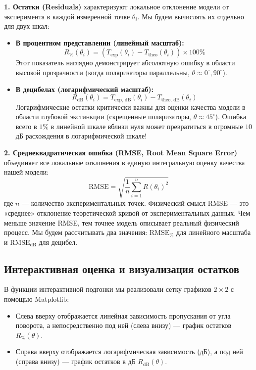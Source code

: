 \textbf{1. Остатки (Residuals)} характеризуют локальное отклонение модели от эксперимента в каждой измеренной точке $\theta_i$. Мы будем вычислять их отдельно для двух шкал:
\begin{itemize}
    \item \textbf{В процентном представлении (линейный масштаб):}
    \begin{equation}
    R_{\%}(\theta_i) = \left( T_{\text{exp}}(\theta_i) - T_{\text{theo}}(\theta_i) \right) \times 100\%
    \end{equation}
    Этот показатель наглядно демонстрирует абсолютную ошибку в области высокой прозрачности (когда поляризаторы параллельны, $\theta \approx 0^\circ, 90^\circ$).
    
    \item \textbf{В децибелах (логарифмический масштаб):}
    \begin{equation}
    R_{\text{dB}}(\theta_i) = T_{\text{exp, dB}}(\theta_i) - T_{\text{theo, dB}}(\theta_i)
    \end{equation}
    Логарифмические остатки критически важны для оценки качества модели в области глубокой экстинкции (скрещенные поляризаторы, $\theta \approx 45^\circ$). Ошибка всего в $1\%$ в линейной шкале вблизи нуля может превратиться в огромные $10$ дБ расхождения в логарифмической шкале!
\end{itemize}

\textbf{2. Среднеквадратическая ошибка (RMSE, Root Mean Square Error)} объединяет все локальные отклонения в единую интегральную оценку качества нашей модели:
\begin{equation}
\text{RMSE} = \sqrt{\frac{1}{n}\sum_{i=1}^n R(\theta_i)^2}
\end{equation}
где $n$ — количество экспериментальных точек. Физический смысл RMSE — это «среднее» отклонение теоретической кривой от экспериментальных данных. Чем меньше значение RMSE, тем точнее модель описывает реальный физический процесс. Мы будем рассчитывать два значения: $\text{RMSE}_{\%}$ для линейного масштаба и $\text{RMSE}_{\text{dB}}$ для децибел.

\subsection{Интерактивная оценка и визуализация остатков}

В функции интерактивной подгонки мы реализовали сетку графиков $2 \times 2$ с помощью Matplotlib:
\begin{itemize}
    \item Слева вверху отображается линейная зависимость пропускания от угла поворота, а непосредственно под ней (слева внизу) — график остатков $R_{\%}(\theta)$.
    \item Справа вверху отображается логарифмическая зависимость (дБ), а под ней (справа внизу) — график остатков в дБ $R_{\text{dB}}(\theta)$.
\end{itemize}

